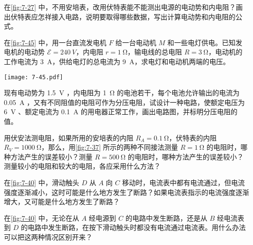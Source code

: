 \begin{Exercise}
\begin{question}
\begin{figurehere}
\begin{minipage}[b]{0.48\linewidth}
      \caption{}\label{fig:7-44}
    \end{minipage}
	\end{figurehere}
  \item 在\cref{fig:7-27} 中，不用安培表，改用伏特表能不能测出电源的电动势和内电阻？画出伏特表应怎祥接入电路，说明要取得哪些数据，写出计算电动势和内电阻的公式。
  \item 在\cref{fig:7-45} 中，用一台直流发电机 $F$ 给一台电动机 $M$ 和一些电灯供电。已知发电机的电动势 $\mathcal{E}=\qty{240}{V}$，内电阻 $r=\qty{1}{\ohm}$，输电线的总电阻 $R=\qty{3}{\ohm}$，电动机的工作电流为 \qty{3}{A}，供给电灯的总电流为 \qty{9}{A}，求电灯和电动机两端的电压。
  \begin{figurehere}
    \begin{minipage}{\linewidth}\centering
      \texttt{[image: 7-45.pdf]}
      \caption{}\label{fig:7-45}
    \end{minipage}
  \end{figurehere}
  \item 现有电动势为 \qty{1.5}{V} ，内电阻为 \qty{1}{\ohm} 的电池若干，每个电池允许输出的电流为 \qty{0.05}{A} ，又有不同阻值的电阻可作为分压电阻，试设计一种电路，使额定电压为 \qty{6}{V} 、额定电流为 \qty{0.1}{A} 的用电器正常工作，画出电路图，并标明分压电阻的值。
  \item 用伏安法测电阻，如果所用的安培表的内阻 $R_A=\qty{0.1}{\ohm}$，伏特表的内阻$R_V=\qty{1000}{\ohm}$，那么，用\cref{fig:7-37} 所示的两种不同接法测量 $R=\qty{1}{\ohm}$ 的电阻时，哪种方法产生的误差较小？测量 $R=\qty{500}{\ohm}$ 的电阻时，哪种方法产生的误差较小？测量较小的电阻和较大的电阻，各应采用什么方法？
  \item 在\cref{fig:7-40} 中，滑动触头 $D$ 从 $A$ 向 $C$ 移动时，电流表中都有电流通过，但电流强度逐渐减小，这时可能是什么地方发生了断路？如果电流表指示的电流强度逐渐增大，又可能是什么地方发生了断路？
  \item 在\cref{fig:7-40} 中，无论在从 $A$ 经电源到 $C$ 的电路中发生断路，还是从 $B$ 经电流表到 $D$ 的电路中发生断路，在按下滑动触头时都没有电流通过电流表。用什么办法可以把这两种情况区别开来？
\end{question}
\end{Exercise}